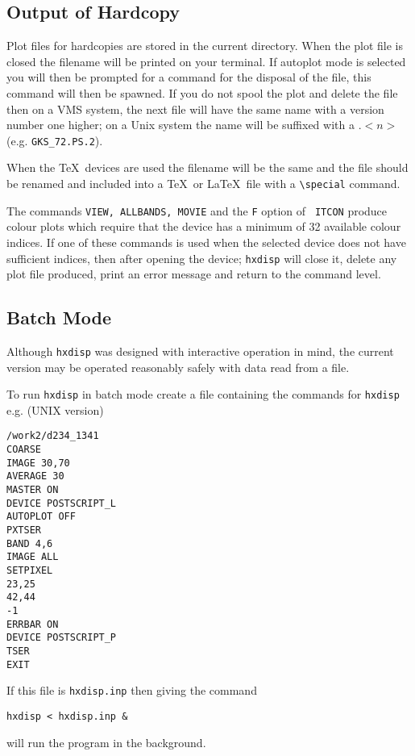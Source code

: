 \subsection{Output of Hardcopy}

Plot files for hardcopies are stored in the current directory. When the
plot file is closed the filename will be printed on your terminal.  If
autoplot mode is selected you will then be prompted for a command for
the disposal of the file, this command will then be spawned.  If you do
not spool the plot and delete the file then on a VMS system, the next
file will have the same name with a version number one higher; on a
Unix system the name will be suffixed with a $.<n>$ (e.g.
\verb!GKS_72.PS.2!).

When the \TeX\ devices are used the filename will be the same and the
file should be renamed and included into a \TeX\ or \LaTeX\ file with a
\verb!\special! command.

The commands {\tt VIEW, ALLBANDS, MOVIE} and the {\tt F} option of {\tt
ITCON} produce colour plots which require that the device has a minimum
of 32 available colour indices. If one of these commands is used when
the selected device does not have sufficient indices, then after
opening the device; \verb!hxdisp! will close it, delete any plot file
produced, print an error message and return to the command level.

\subsection{Batch Mode}

Although \verb!hxdisp! was designed with interactive operation in mind,
the current version may be operated reasonably safely with data read
from a file.

To run \verb!hxdisp! in batch mode create a file containing the
commands for
\verb!hxdisp! e.g. (UNIX version)

\begin{verbatim}
/work2/d234_1341
COARSE 
IMAGE 30,70 
AVERAGE 30 
MASTER ON 
DEVICE POSTSCRIPT_L 
AUTOPLOT OFF
PXTSER 
BAND 4,6 
IMAGE ALL 
SETPIXEL 
23,25 
42,44 
-1 
ERRBAR ON
DEVICE POSTSCRIPT_P 
TSER 
EXIT
\end{verbatim}

If this file is \verb!hxdisp.inp! then giving the command
\begin{verbatim}
hxdisp < hxdisp.inp &
\end{verbatim}
will run the program in the background.

